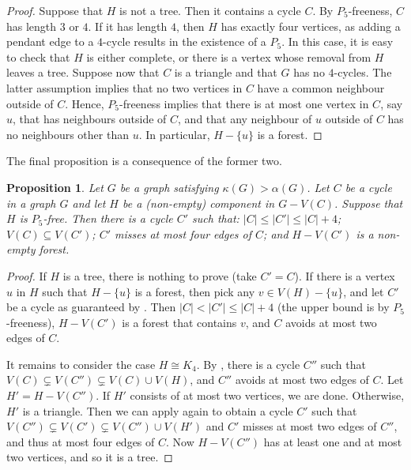 \documentclass[11pt,english]{article}
\theoremstyle{plain}
\newtheorem{proposition}[theorem]{Proposition}
\theoremstyle{definition}
\theoremstyle{remark}
\begin{document}
		\begin{proof}
			Suppose that $H$ is not a tree. Then it contains a cycle $C$. By $P_5$-freeness, $C$ has length $3$ or $4$. If it has length $4$, then $H$ has exactly four vertices, as adding a pendant edge to a $4$-cycle results in the existence of a $P_5$. In this case, it is easy to check that $H$ is either complete, or there is a vertex whose removal from $H$ leaves a tree.
			Suppose now that $C$ is a triangle and that $G$ has no $4$-cycles. The latter assumption implies that no two vertices in $C$ have a common neighbour outside of $C$. Hence, $P_5$-freeness implies that there is at most one vertex in $C$, say $u$, that has neighbours outside of $C$, and that any neighbour of $u$ outside of $C$ has no neighbours other than $u$. In particular, $H - \{u\}$ is a forest.
		\end{proof}

		The final proposition is a consequence of the former two.

		\begin{proposition} \label{prop:tree}
			Let $G$ be a graph satisfying $\kappa(G) > \alpha(G)$.
			Let $C$ be a cycle in a graph $G$ and let $H$ be a (non-empty) component in $G - V(C)$. Suppose that $H$ is $P_5$-free. Then there is a cycle $C'$ such that: $|C| \le |C'| \le |C|+4$; $V(C) \subseteq V(C')$; $C'$ misses at most four edges of $C$; and $H - V(C')$ is a non-empty forest.
		\end{proposition}

		\begin{proof}
			If $H$ is a tree, there is nothing to prove (take $C' = C$). 
			If there is a vertex $u$ in $H$ such that $H - \{u\}$ is a forest, then pick any $v \in V(H) - \{u\}$, and let $C'$ be a cycle as guaranteed by . Then $|C| < |C'| \le |C| + 4$ (the upper bound is by $P_5$-freeness), $H - V(C')$ is a forest that contains $v$, and $C$ avoids at most two edges of $C$.

			It remains to consider the case $H \cong K_4$. By , there is a cycle $C''$ such that $V(C) \subsetneq V(C'') \subsetneq V(C) \cup V(H)$, and $C''$ avoids at most two edges of $C$. Let $H' = H - V(C'')$. If $H'$ consists of at most two vertices, we are done. Otherwise, $H'$ is a triangle. Then we can apply  again to obtain a cycle $C'$ such that $V(C'') \subsetneq V(C') \subsetneq V(C'') \cup V(H')$ and $C'$ misses at most two edges of $C''$, and thus at most four edges of $C$. Now $H - V(C'')$ has at least one and at most two vertices, and so it is a tree. 
		\end{proof}
\end{document}
